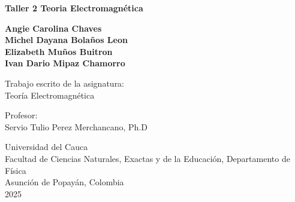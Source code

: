\begin{titlepage}

    \begin{center}

        {\fontsize{18}{18}\selectfont \textbf{{Taller 2 Teoria Electromagnética }}}
            
        \vfill

        {\textbf{Angie Carolina Chaves\\
        Michel Dayana Bolaños Leon\\
        Elizabeth Muños Buitron\\
        Ivan Dario Mipaz Chamorro\\
        }}
        \vfill
        
        {Trabajo  escrito de la asignatura:}\\
        {Teoría Electromagnética}
        
        \vfill
        
        {Profesor:}\\
        {Servio Tulio Perez Merchancano}, {Ph.D}

        
        \vfill

        {Universidad del Cauca}\\
        {Facultad de Ciencias Naturales, Exactas y de la Educación, Departamento de Física}\\
        {Asunción de Popayán, Colombia}\\
        {2025}
        
        \end{center}

\end{titlepage}
